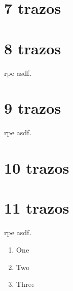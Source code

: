 \documentclass[]{article}
\begin{document}
\section{7 trazos}\label{7trazos}\setcounter{subsection}{148}
\begin{multicols}{2}

\end{multicols}
\section{8 trazos}\label{8trazos}\setcounter{subsection}{166}
rpe asdf.
\begin{multicols}{2}

\end{multicols}
\section{9 trazos}\label{9trazos}\setcounter{subsection}{175}
rpe asdf.
\begin{multicols}{2}

\end{multicols}
\section{10 trazos}\label{10trazos}\setcounter{subsection}{186}
\begin{multicols}{2}

\end{multicols}
\section{11 trazos}\label{11trazos}\setcounter{subsection}{194}
rpe asdf.
\begin{multicols}{2}

\end{multicols}



\begin{enumerate}[label=\Roman*]
  \item One 
  \item Two 
  \item Three
\end{enumerate}
\end{document}
